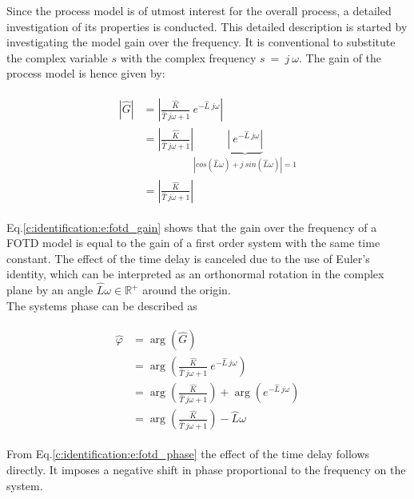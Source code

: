 Since the process model is of utmost interest for the overall process, a detailed investigation of its properties is conducted. This detailed description is started by investigating the model gain over the frequency. It is conventional to substitute the complex variable $s$ with the complex frequency $s~=~j~\omega$. The gain of the process model is hence given by:

\begin{align}
\begin{split}
\left| \hat{G} \right| &= \left| \frac{\hat{K}}{\hat{T}~j\omega+1} ~ e^{-\hat{L}~j\omega} \right| \\
&= \left| \frac{\hat{K}}{\hat{T}~j\omega+1} \right| \underbrace{\left| ~ e^{-\hat{L}~j\omega} \right|}_{\left|cos(\hat{L}\omega)+j~sin(\hat{L}\omega)\right| = 1} \\
&= \left| \frac{\hat{K}}{\hat{T}~j\omega+1} \right|
\end{split}
\label{c:identification:e:fotd_gain}
\end{align}

Eq.\ref{c:identification:e:fotd_gain} shows that the gain over the frequency of a FOTD model is equal to the gain of a first order system with the same time constant. The effect of the time delay is canceled due to the use of Euler's identity, which can be interpreted as an orthonormal rotation in the complex plane by an angle $\hat{L}\omega \in \mathbb{R}^+$ around the origin.\\

The systems phase can be described as

\begin{align}
\begin{split}
\hat{\varphi} &= \arg\left( \hat{G} \right) \\
&= \arg\left(\frac{\hat{K}}{\hat{T}~j\omega+1} ~ e^{-\hat{L}~j\omega} \right) \\
&= \arg\left(\frac{\hat{K}}{\hat{T}~j\omega+1}\right) + \arg\left( e^{-\hat{L}~j\omega}\right) \\
&= \arg\left(\frac{\hat{K}}{\hat{T}~j\omega+1}\right) - \hat{L}\omega
\end{split}
\label{c:identification:e:fotd_phase}
\end{align}

From Eq.\ref{c:identification:e:fotd_phase} the effect of the time delay follows directly. It imposes a negative shift in phase proportional to the frequency on the system. \\

